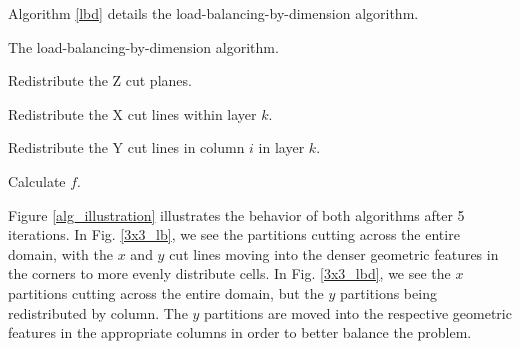 Algorithm \ref{lbd} details the load-balancing-by-dimension algorithm.
\begin{algorithm}[H]
\caption{The load-balancing-by-dimension algorithm.}
\label{lbd}
\begin{algorithmic}

    \STATE Redistribute the Z cut planes.
  \ENDWHILE

      \STATE Redistribute the X cut lines within layer $k$.
    \ENDWHILE
  \ENDFOR

        \STATE Redistribute the Y cut lines in column $i$ in layer $k$.
      \ENDWHILE
    \ENDFOR
  \ENDFOR

  \STATE Calculate $f$.
\end{algorithmic}
\end{algorithm}

Figure \ref{alg_illustration} illustrates the behavior of both algorithms after 5 iterations. In Fig. \ref{3x3_lb}, we see the partitions cutting across the entire domain, with the $x$ and $y$ cut lines moving into the denser geometric features in the corners to more evenly distribute cells. In Fig. \ref{3x3_lbd}, we see the $x$ partitions cutting across the entire domain, but the $y$ partitions being redistributed by column. The $y$ partitions are moved into the respective geometric features in the appropriate columns in order to better balance the problem.

